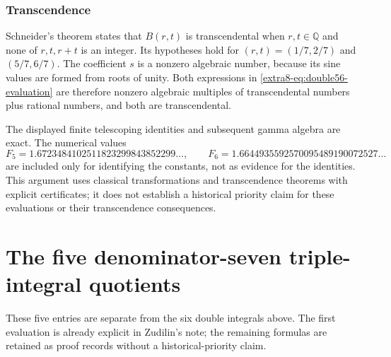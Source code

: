 \documentclass[11pt,a4paper]{article}
\theoremstyle{definition}
\theoremstyle{remark}
\numberwithin{equation}{section}
\begin{document}
\subsubsection{Transcendence}

Schneider's theorem \cite[p.~114]{extra8-schneider} states that $B(r,t)$ is
transcendental when $r,t\in\mathbb Q$ and none of $r,t,r+t$ is an integer.
Its hypotheses hold for $(r,t)=(1/7,2/7)$ and $(5/7,6/7)$.
The coefficient $s$ is a nonzero algebraic number, because its sine values
are formed from roots of unity. Both expressions in
\eqref{extra8-eq:double56-evaluation} are therefore nonzero algebraic multiples
of transcendental numbers plus rational numbers, and both are
transcendental.

The displayed finite telescoping identities and subsequent gamma algebra
are exact. The numerical values
\[
 F_5=1.6723484102511823299843852299\ldots,\qquad
 F_6=1.6644935592570095489190072527\ldots
\]
are included only for identifying the constants, not as evidence for the
identities. This argument uses classical transformations and transcendence
theorems with explicit certificates; it does not establish a historical
priority claim for these evaluations or their transcendence consequences.



\section{The five denominator-seven triple-integral quotients}
\label{extra-seven}
These five entries are separate from the six double integrals above.
The first evaluation is already explicit in Zudilin's note; the remaining
formulas are retained as proof records without a historical-priority claim.
\end{document}
